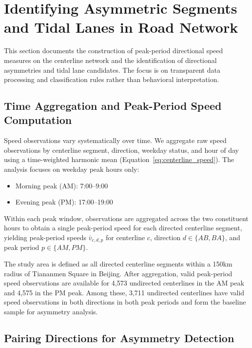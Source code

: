 \documentclass[12pt]{article}
\begin{document}
	\clearpage

	
	\section{Identifying Asymmetric Segments and Tidal Lanes in Road Network}
	\label{sec:asym_sec}
	This section documents the construction of peak-period directional speed measures on the centerline network and the identification of directional asymmetries and tidal lane candidates. The focus is on transparent data processing and classification rules rather than behavioral interpretation.
	
	\subsection{Time Aggregation and Peak-Period Speed Computation}
	
	Speed observations vary systematically over time. We aggregate raw speed observations by centerline segment, direction, weekday status, and hour of day using a time-weighted harmonic mean (Equation~\eqref{eq:centerline_speed}). The analysis focuses on weekday peak hours only:
	\begin{itemize}
		\item Morning peak (AM): 7:00--9:00
		\item Evening peak (PM): 17:00--19:00
	\end{itemize}
	Within each peak window, observations are aggregated across the two constituent hours to obtain a single peak-period speed for each directed centerline segment, yielding peak-period speeds $\bar{v}_{c,d,p}$ for centerline $c$, direction $d \in \{AB, BA\}$, and peak period $p \in \{AM, PM\}$.
	
	The study area is defined as all directed centerline segments within a 150km radius of Tiananmen Square in Beijing. After aggregation, valid peak-period speed observations are available for 4,573 undirected centerlines in the AM peak and 4,575 in the PM peak. Among these, 3,711 undirected centerlines have valid speed observations in both directions in both peak periods and form the baseline sample for asymmetry analysis.
	
	\subsection{Pairing Directions for Asymmetry Detection}
	
\end{document}
